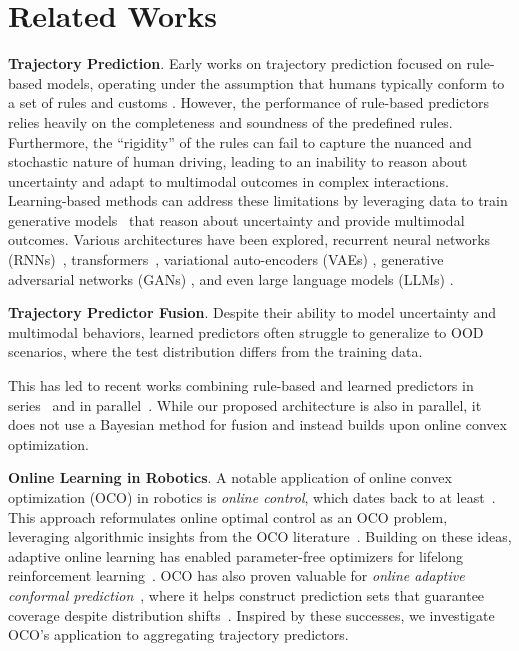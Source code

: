 \section{Related Works}
\label{sec:related}

{\bf Trajectory Prediction}. Early works on trajectory prediction focused on rule-based models, operating under the assumption that humans typically conform to a set of rules and customs \cite{6696982}. 
However, the performance of rule-based predictors relies heavily on the completeness and soundness of the predefined rules. Furthermore, the ``rigidity'' of the rules can fail to capture the nuanced and stochastic nature of human driving, leading to an inability to reason about uncertainty and adapt to multimodal outcomes in complex interactions. 
Learning-based methods can address these limitations by leveraging data to train generative models~\cite{salzmann20eccv-trajectron++,chen22cvpr-scept,yuan21iccv-agentformer} that reason about uncertainty and provide multimodal outcomes. 
Various architectures have been explored, \eg recurrent neural networks (RNNs)~\cite{7780479, kamenev2022predictionnet}, transformers~\cite{yuan21iccv-agentformer}, variational auto-encoders (VAEs) \cite{salzmann20eccv-trajectron++}, generative adversarial networks (GANs) \cite{gupta2018social}, and even large language models (LLMs) \cite{bae2024can}.  

{\bf Trajectory Predictor Fusion}. 
Despite their ability to model uncertainty and multimodal behaviors, learned predictors often struggle to generalize to OOD scenarios, where the test distribution differs from the training data.

This has led to recent works combining rule-based and learned predictors in series~\cite{song2021learning, li2023planninginspired, pmlr-v155-li21b} and in parallel~\cite{veer23arxiv-mpf, sun2021complementing, patrikar2024rulefuser}. While our proposed architecture is also in parallel, it does not use a Bayesian method for fusion and instead builds upon online convex optimization.

{\bf Online Learning in Robotics}.
A notable application of online convex optimization (OCO) in robotics is \emph{online control}, which dates back to at least~\cite{agarwal19icml-online}. This approach reformulates online optimal control as an OCO problem, leveraging algorithmic insights from the OCO literature~\cite{hazan22-introduction}. Building on these ideas, adaptive online learning has enabled parameter-free optimizers for lifelong reinforcement learning~\cite{muppidi2024pick}. OCO has also proven valuable for \emph{online adaptive conformal prediction}~\cite{gibbs21-adaptive}, where it helps construct prediction sets that guarantee coverage despite distribution shifts~\cite{zhang2024discountedn,bhatnagar2023improved}. Inspired by these successes, we investigate OCO's application to aggregating trajectory predictors.
